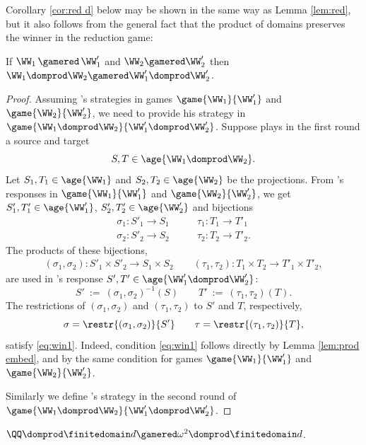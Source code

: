 Corollary \ref{cor:red d} below may be shown in the same way as Lemma \ref{lem:red},
but it also follows from the general fact that the product of domains preserves the winner 
in the reduction game:
%
\begin{lemmarep} \label{lem:red prod}
If $\WW_1\,{\gamered}\, \WW'_1$ and $\WW_2\gamered\WW'_2$ then
$\WW_1 {\domprod} \WW_2 \gamered \WW'_1 {\domprod} \WW'_2$.
\end{lemmarep}
%
\begin{proof}
Assuming  \Reducer's strategies in
games $\game {\WW_1} {\WW'_1}$ and $\game {\WW_2} {\WW'_2}$, we need to provide his strategy in
 $\game {\WW_1\domprod\WW_2} {\WW'_1\domprod\WW'_2}$.
Suppose \Spoiler plays in the first round a source and target 
\[
S, T\in\age{\WW_1\domprod \WW_2}.
\]
Let $S_1, T_1 \in \age {\WW_1}$ and $S_2, T_2\in\age{\WW_2}$ be the projections.
From \Reducer's responses in $\game {\WW_1} {\WW'_1}$ and
$\game {\WW_2} {\WW'_2}$, we get
$S'_1, T'_1 \in \age {\WW'_1}$, $S'_2, T'_2\in\age{\WW'_2}$  and bijections
\begin{align*}
\sigma_1 : S'_1 \to S_1& \qquad \tau_1 :  T_1 \to T'_1 \\
\sigma_2 : S'_2 \to S_2& \qquad \tau_2 :  T_2 \to T'_2.
\end{align*}
The products of these bijections,
\begin{align*}
(\sigma_1, \sigma_2) : S'_1\times S'_2 \to S_1\times S_2 \qquad 
(\tau_1, \tau_2) :  T_1\times T_2 \to T'_1\times T'_2,
\end{align*}
are used in \Reducer's response 
$S', T'\in\age{\WW'_1\domprod \WW'_2}$:
\[
S' \ := \ (\sigma_1, \sigma_2)^{-1}(S) \qquad
T' \ := \ (\tau_1, \tau_2)(T).
\]
The restrictions of $(\sigma_1, \sigma_2)$ and $(\tau_1, \tau_2)$ to $S'$ and $T$, respectively,
\[
\sigma = \restr{(\sigma_1, \sigma_2)}{S'} \qquad
\tau = \restr{(\tau_1, \tau_2)}{T},
\]
satisfy \eqref{eq:win1}. Indeed, condition \eqref{eq:win1} follows directly by Lemma \ref{lem:prod embed}, and by 
the same condition for games $\game {\WW_1} {\WW'_1}$ and $\game {\WW_2} {\WW'_2}$.

Similarly we define \Reducer's strategy in the second round of $\game {\WW_1\domprod\WW_2} {\WW'_1\domprod\WW'_2}$.
\end{proof}
%
\begin{corollary} \label{cor:red d}
$\QQ \domprod \finitedomain d \gamered \omega^2 \domprod \finitedomain d$.
\end{corollary}

